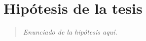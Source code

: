 \section{Hipótesis de la tesis}
\label{sec:hipotesis}


\begin{quote}
  \textit{Enunciado de la hipótesis aquí.}
\end{quote}
